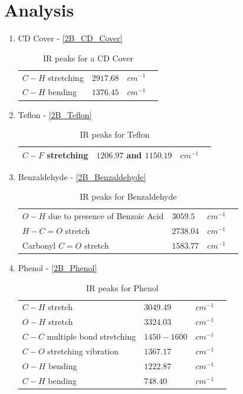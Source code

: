 \section{Analysis}
	\begin{enumerate}
		\item CD Cover - \autoref{2B_CD_Cover}
			\begin{table}
				\myfloatalign
				\begin{tabularx}{\textwidth}{Xlll}
					\hline%
					$C-H$ stretching					& 	$2917.68$	& 	$cm^{-1}$\\
					$C-H$ bending						& 	$1376.45$	& 	$cm^{-1}$\\
					\hline%
				\end{tabularx}
				\caption{IR peaks for a CD Cover}
				\label{2B_CD_Cover}
			\end{table}
		\item Teflon - \autoref{2B_Teflon}
			\begin{table}
				\myfloatalign
				\begin{tabularx}{\textwidth}{Xlll}
					\hline%
					$C-F$ stretching					& 	$1206.97$ and $1150.19$ & 	$cm^{-1}$\\
					\hline%
				\end{tabularx}
				\caption{IR peaks for Teflon}
				\label{2B_Teflon}
			\end{table}
		\item Benzaldehyde - \autoref{2B_Benzaldehyde}
			\begin{table}
				\myfloatalign
				\begin{tabularx}{\textwidth}{Xlll}
					\hline%
					$O-H$ due to presence of Benzoic Acid	& 	$3059.5$	& 	$cm^{-1}$\\
					$H-C=O$ stretch						& 	$2738.04$	& 	$cm^{-1}$\\
					Carbonyl $C=O$ stretch					& 	$1583.77$	& 	$cm^{-1}$\\
					\hline%
				\end{tabularx}
				\caption{IR peaks for Benzaldehyde}
				\label{2B_Benzaldehyde}
			\end{table}

		\item Phenol - \autoref{2B_Phenol}
			\begin{table}
				\myfloatalign
				\begin{tabularx}{\textwidth}{Xlll}
					\hline%
					$C-H$ stretch	& 	$3049.49$	& 	$cm^{-1}$\\
					$O-H$ stretch	& 	$3324.03$	& 	$cm^{-1}$\\
					$C-C$ multiple bond stretching	& 	$1450-1600$	& 	$cm^{-1}$\\
					$C-O$ stretching vibration 	& 	$1367.17$	& 	$cm^{-1}$\\
					$O-H$ bending 	& 	$1222.87$	& 	$cm^{-1}$\\
					$C-H$ bending 	& 	$748.40$	& 	$cm^{-1}$\\
					\hline%
				\end{tabularx}
				\caption{IR peaks for Phenol}
				\label{2B_Phenol}
			\end{table}


\end{enumerate}
